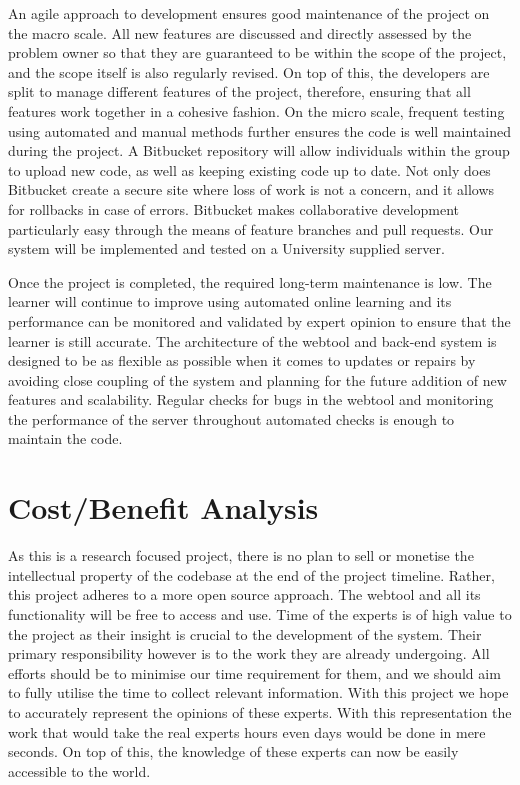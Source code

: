 \documentclass{ecmm427_assignment}
\begin{document}
 An agile approach to development ensures good maintenance of the project on the macro scale. All new features are discussed and directly assessed by the problem owner so that they are guaranteed to be within the scope of the project, and the scope itself is also regularly revised. On top of this, the developers are split to manage different features of the project, therefore, ensuring that all features work together in a cohesive fashion. On the micro scale, frequent testing using automated and manual methods further ensures the code is well maintained during the project. A Bitbucket repository will allow individuals within the group to upload new code, as well as keeping existing code up to date.  Not only does Bitbucket create a secure site where loss of work is not a concern, and it  allows for rollbacks in case of errors. Bitbucket makes collaborative development particularly easy through the means of feature branches and pull requests. Our system will be implemented and tested on a University supplied server.

 Once the project is completed, the required long-term maintenance is low. The learner will continue to improve using automated online learning and its performance can be monitored and validated by expert opinion to ensure that the learner is still accurate. The architecture of the webtool and back-end system is designed to be as flexible as possible when it comes to updates or repairs by avoiding close coupling of the system and planning for the future addition of new features and scalability. Regular checks for bugs in the webtool and monitoring the performance of the server throughout automated checks is enough to maintain the code.

\section{Cost/Benefit Analysis}

As this is a research focused project, there is no plan to sell or monetise the intellectual property of the codebase at the end of the project timeline. Rather, this project adheres to a more open source approach. The webtool and all its functionality will be free to access and use. Time of the experts is of high value to the project as their insight is crucial to the development of the system. Their primary responsibility however is to the work they are already undergoing. All efforts should be to minimise our time requirement for them, and we should aim to fully utilise the time to collect relevant information. With this project we hope to accurately represent the opinions of these experts. With this representation the work that would take the real experts hours even days would be done in mere seconds. On top of this, the knowledge of these experts can now be easily accessible to the world.
\end{document}
